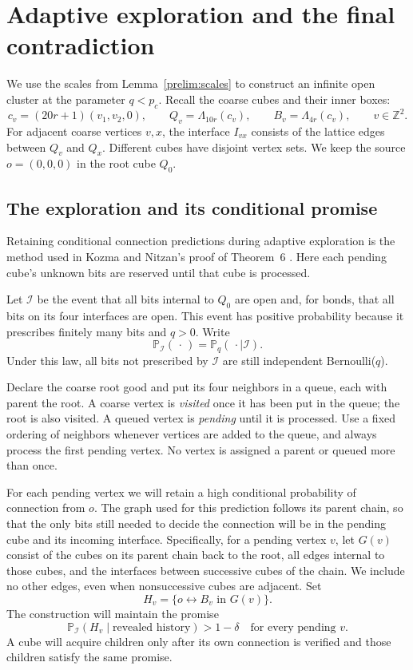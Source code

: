 \section{Adaptive exploration and the final contradiction}
\label{sec:exploration}

We use the scales from Lemma~\ref{prelim:scales} to construct an infinite
open cluster at the parameter $q<p_c$. Recall the coarse cubes and their
inner boxes:
\[
 c_v=(20r+1)(v_1,v_2,0),\qquad
 Q_v=\Lambda_{10r}(c_v),\qquad B_v=\Lambda_{4r}(c_v),
 \qquad v\in\mathbb Z^2.
\]
For adjacent coarse vertices $v,x$, the interface $I_{vx}$ consists of the
lattice edges between $Q_v$ and $Q_x$. Different cubes have disjoint
vertex sets. We keep the source $o=(0,0,0)$ in the root cube $Q_0$.

\subsection{The exploration and its conditional promise}

Retaining conditional connection predictions during adaptive exploration
is the method used in Kozma and Nitzan's proof of Theorem~6
\cite[Section~4, equations~(30)--(32)]{KozmaNitzan2024}.
Here each pending cube's unknown bits are reserved until that cube is processed.

Let $\mathcal I$ be the event that all bits internal to $Q_0$ are open
and, for bonds, that all bits on its four interfaces are open. This event
has positive probability because it prescribes finitely many bits and
$q>0$. Write
\[
 \mathbb P_{\mathcal I}(\,\cdot\,)
   =\mathbb P_q(\,\cdot\mid\mathcal I).
\]
Under this law, all bits not prescribed by $\mathcal I$ are still
independent Bernoulli($q$).

Declare the coarse root good and put its four neighbors in a queue, each
with parent the root. A coarse vertex is \emph{visited} once it has been
put in the queue; the root is also visited. A queued vertex is
\emph{pending} until it is processed. Use a fixed ordering of neighbors
whenever vertices are added to the queue, and always process the first
pending vertex. No vertex is assigned a parent or queued more than once.

For each pending vertex we will retain a high conditional probability
of connection from $o$. The graph used for this prediction follows
its parent chain, so that the only bits still needed to decide the
connection will be in the pending cube and its incoming interface.
Specifically, for a pending vertex $v$, let $G(v)$ consist of the
cubes on its parent chain back to the root, all edges internal to
those cubes, and the interfaces between successive cubes of the
chain. We include no other edges, even when nonsuccessive cubes
are adjacent. Set
\[
 H_v=\{o\leftrightarrow B_v\text{ in }G(v)\}.
\]
The construction will maintain the promise
\begin{equation}
 \mathbb P_{\mathcal I}(H_v\mid\text{revealed history})>1-\delta
 \quad\text{for every pending }v.
 \label{exp:promise}
\end{equation}
A cube will acquire children only after its own connection is
verified and those children satisfy the same promise.

